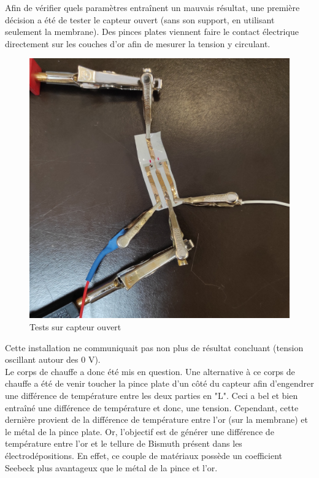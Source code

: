 Afin de vérifier quels paramètres entraînent un mauvais résultat, une première décision a été de tester le \gls{capteur} ouvert (sans son support,
en utilisant seulement la membrane).
Des pinces plates viennent faire le contact électrique directement sur les couches d'or afin de mesurer la tension y circulant.
\begin{figure}[H]
    \centering
    \includegraphics[scale = 0.05]{assets/figures/CapteurOuvert.jpg}
    \caption{Tests sur capteur ouvert}
    \label{fig:capteurOuvert}
\end{figure}
Cette installation ne communiquait pas non plus de résultat concluant (tension oscillant autour des 0 V). \\

Le corps de chauffe a donc été mis en question. Une alternative à ce corps de chauffe a été de venir toucher la pince plate d'un côté du
capteur afin d'engendrer une différence de température entre les deux parties en "L". Ceci a bel et bien entraîné une différence de
température et donc, une tension. Cependant, cette dernière provient de la différence de température entre l'or (sur la membrane) et le métal
de la pince plate. Or, l'objectif est de générer une différence de température entre l'or et le tellure de Bismuth présent dans les électrodépositions. 
En effet, ce couple de matériaux possède un coefficient Seebeck plus avantageux que le métal de la pince et l'or. \\

